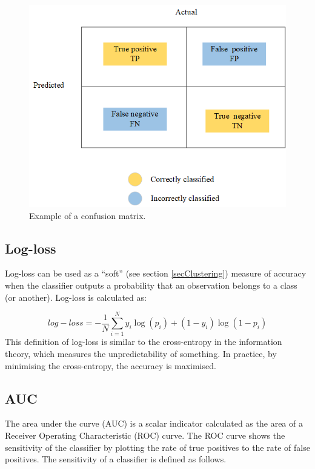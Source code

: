 \begin{figure}[hbt!]
\centering
\includegraphics[width=1\textwidth]{SectionLetsMath/linearClassification_figures/fig_confusionMatrix.png}
\captionsetup{type=figure}
\caption{Example of a confusion matrix.}
\label{fig_confusionMatrix}
\end{figure}

\subsection{Log-loss}
Log-loss can be used as a “soft” (see section \ref{secClustering}) measure of accuracy when the classifier outputs a probability that an observation belongs to a class (or another). Log-loss is calculated as:

\begin{equation}
    log-loss=-\frac{1}{N}\sum_{i=1}^{N}{y_i\log{(p_i)}+(1-y_i)\log(1-p_i)}
    \label{eq_logloss}
\end{equation}
This definition of log-loss is similar to the cross-entropy in the information theory, which measures the unpredictability of something. In practice, by minimising the cross-entropy, the accuracy is maximised.

\subsection{AUC}
The area under the curve (AUC) is a scalar indicator calculated as the area of a Receiver Operating Characteristic (ROC) curve. The ROC curve shows the sensitivity of the classifier by plotting the rate of true positives to the rate of false positives. The sensitivity of a classifier is defined as follows.

